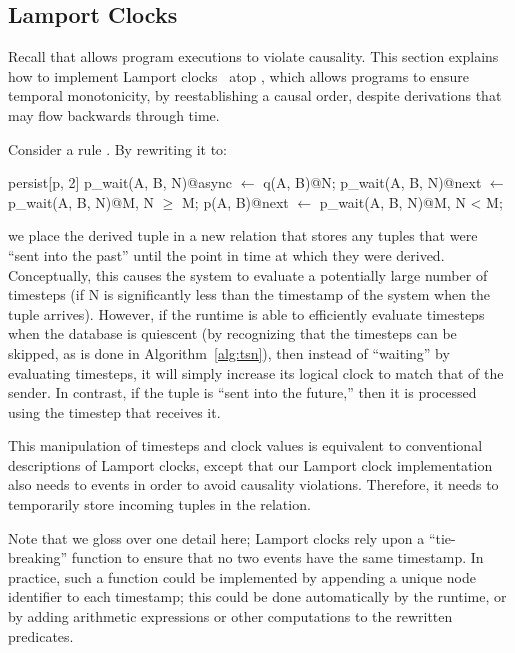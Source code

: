 
\subsection{Lamport Clocks}

Recall that \lang allows program executions to violate causality.
This section explains how to implement Lamport
clocks~\cite{timeclocks} atop \lang, which allows programs to ensure
temporal monotonicity, by reestablishing a causal order,
despite derivations that may flow backwards through time.

Consider a rule .  By
rewriting it to:

\begin{Dedalus}
persist[p, 2]
p\_wait(A, B, N)@async \(\leftarrow\) q(A, B)@N;
p\_wait(A, B, N)@next \(\leftarrow\) p\_wait(A, B, N)@M, N \(\ge\) M;
p(A, B)@next \(\leftarrow\) p\_wait(A, B, N)@M, N < M;
\end{Dedalus}

we place the derived tuple in a new relation  that
stores any tuples that were ``sent into the past'' until the point in
time at which they were derived.  Conceptually, this causes the system
to evaluate a potentially large number of timesteps (if N is
significantly less than the timestamp of the system when the tuple
arrives).  However, if the runtime is able to efficiently evaluate
timesteps when the database is quiescent (by recognizing that the
timesteps can be skipped, as is done in Algorithm~\ref{alg:tsn}), then
instead of ``waiting'' by evaluating timesteps, it will simply
increase its logical clock to match that of the sender.  In contrast,
if the tuple is ``sent into the future,'' then it is processed using
the timestep that receives it.

This manipulation of timesteps and clock values is equivalent to
conventional descriptions of Lamport clocks, except that our Lamport
clock implementation also needs to events in order to avoid causality
violations.  Therefore, it needs to temporarily store incoming tuples
in the  relation.

Note that we gloss over one detail here; Lamport clocks rely
upon a ``tie-breaking'' function to ensure that no two events have the
same timestamp.  In practice, such a function could be implemented by
appending a unique node identifier to each timestamp; this could be
done automatically by the runtime, or by adding arithmetic expressions
or other computations to the rewritten predicates.

